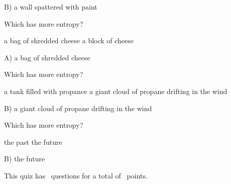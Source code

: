 \documentclass[11pt,addpoints]{exam}   	%
\begin{document}
\begin{questions}
\begin{solution}
B) a wall spattered with paint
\end{solution}

\vspace{0.2in}

\question[2] Which has more entropy?

\begin{choices}
\choice a bag of shredded cheese
\choice a block of cheese
\end{choices}

\vspace{0.2in}

\begin{solution}
A) a bag of shredded cheese
\end{solution}

\vspace{0.2in}

\question[2] Which has more entropy?

\begin{choices}
\choice a tank filled with propance
\choice a giant cloud of propane drifting in the wind
\end{choices}

\begin{solution}
B) a giant cloud of propane drifting in the wind
\end{solution}


\vspace{0.2in}

\question[2] Which has more entropy?

\begin{choices}
\choice the past
\choice the future
\end{choices}

\begin{solution}
B) the future
\end{solution}

\end{questions}

\begin{center}
This quiz has \numquestions\ questions for a total of \numpoints\ points.
\end{center}
\end{document}
